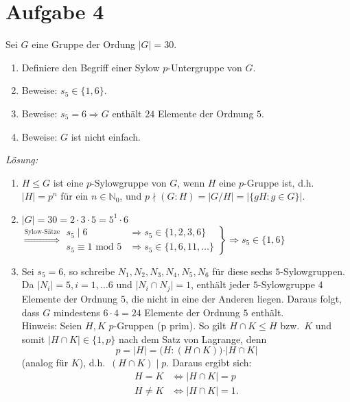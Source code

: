 \documentclass[]{scrartcl}
\newcommand{\N}{\mathbb{N}}
\newcommand{\<}{\trianglelefteq}
\newcommand{\abs}[1]{\vert #1\vert}
\begin{document}
\pagebreak

\section*{Aufgabe 4}
Sei $G$ eine Gruppe der Ordung $\abs{G}=30$.
\begin{enumerate}[label=(\alph*)]
	\item Definiere den Begriff einer Sylow $p$-Untergruppe von $G$.
	\item Beweise: $s_5\in \{1,6\}$.
	\item Beweise: $s_5=6 \Rightarrow G$ enthält $24$ Elemente der Ordnung $5$.
	\item Beweise: $G$ ist nicht einfach.
\end{enumerate}
\textit{Lösung:}
\begin{enumerate}[label=zu (\alph*):]
	\item $H\leq G$ ist eine $p$-Sylowgruppe von $G$, wenn $H$ eine $p$-Gruppe ist, d.h.\ $\abs{H}=p^n$ für ein $n\in\N_0$, und $p\nmid(G\colon H)=\abs{ G/H}=\abs{\{gH\colon g\in G\}}$.
	\item $\abs{G}=30 =2\cdot 3\cdot 5=5^1\cdot 6$\\
			$\overset{\text{Sylow-Sätze}}{\Rightarrow}\left.
			\begin{array}{rll}
				s_5\mid6 &\Rightarrow s_5\in \{1,2,3,6\}\\
				s_5\equiv 1\text{ mod }5 &\Rightarrow s_5\in \{1,6,11,\dots\}
			\end{array}
			\right\}\Rightarrow s_5\in\{1,6\}$
	\item Sei $s_5=6$, so schreibe $N_1,N_2,N_3,N_4,N_5,N_6$ für diese sechs $5$-Sylowgruppen.  Da $\abs{N_i}=5, i=1,\dots 6$ und $\abs{N_i\cap N_j}=1$, enthält jeder $5$-Sylowgruppe $4$ Elemente der Ordnung $5$, die nicht in eine der Anderen liegen. Daraus folgt, dass $G$ mindestens $6\cdot 4=24$ Elemente der Ordnung $5$ enthält.\\
		Hinweis:
		Seien $H,K$ $p$-Gruppen (p prim). So gilt $H\cap K\leq H$ bzw.\ $K$ und somit $\abs{H\cap K}\in\{1,p\}$ nach dem Satz von Lagrange, denn
		\begin{equation*}
			p=\abs{H}=\big(H\colon (H\cap K)\big)\cdot \abs{H\cap K}
		\end{equation*} (analog für $K$), d.h.\ $(H\cap K)\mid p$. Daraus ergibt sich:
		\begin{align*}
			H=K &\Leftrightarrow \abs{H\cap K}=p\\
			H\ne K &\Leftrightarrow \abs{H\cap K}=1.
		\end{align*}

\end{enumerate}
\end{document}
